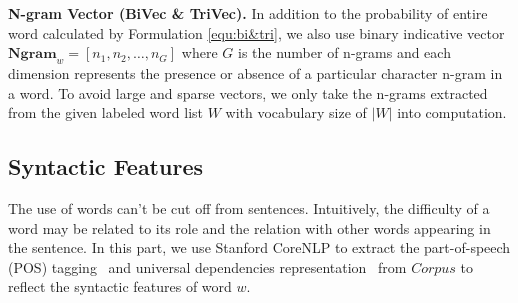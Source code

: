 \textbf{N-gram Vector (BiVec \& TriVec).}
In addition to the probability of entire word calculated by Formulation \ref{equ:bi&tri}, 
we also use binary indicative vector $\mathbf{Ngram}_w=[n_1, n_2, \dots, n_G]$ where $G$ is the number of n-grams and each dimension represents the presence or absence of a particular character n-gram in a word.
To avoid large and sparse vectors, we only take the n-grams extracted from the given labeled word list $W$ with vocabulary size of $|W|$ into computation.
\subsection{Syntactic Features}
The use of words can't be cut off from sentences. 
Intuitively, the difficulty of a word may be related to its role 
and the relation with other words appearing in the sentence.
In this part, we use Stanford CoreNLP to extract the part-of-speech (POS) tagging~\cite{toutanova2003feature} and universal dependencies representation~\cite{schuster2016enhanced}  from $Corpus$ to reflect the syntactic features of word $w$. 

